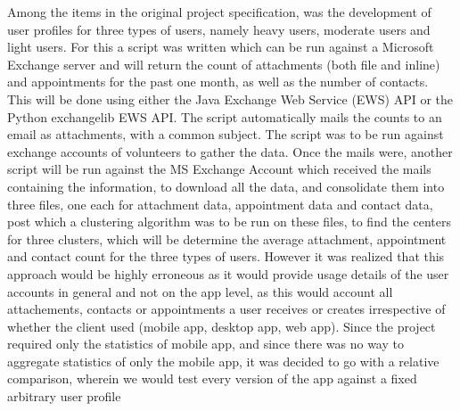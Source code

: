 Among the items in the original project specification, was the development of user profiles for three types of users, namely heavy users, moderate users and light users. For this a script was written which can be run against a Microsoft Exchange server and will return the count of attachments (both file and inline) and appointments for the past one month, as well as the number of contacts. This will be done using either the Java Exchange Web Service (EWS) API or the Python exchangelib EWS API. The script automatically mails the counts to an email as attachments, with a common subject. The script was to be run against exchange accounts of volunteers to gather the data. Once the mails were, another script will be run against the MS Exchange Account which received the mails containing the information, to download all the data, and consolidate them into three files, one each for attachment data, appointment data and contact data, post which a clustering algorithm was to be run on these files, to find the centers for three clusters, which will be determine the average attachment, appointment and contact count for the three types of users. However it was realized that this approach would be highly erroneous as it would provide usage details of the user accounts in general and not on the app level, as this would account all attachements, contacts or appointments a user receives or creates irrespective of whether the client used (mobile app, desktop app, web app). Since the project required only the statistics of mobile app, and since there was no way to aggregate statistics of only the mobile app, it was decided to go with a relative comparison, wherein we would test every version of the app against a fixed arbitrary user profile\\

